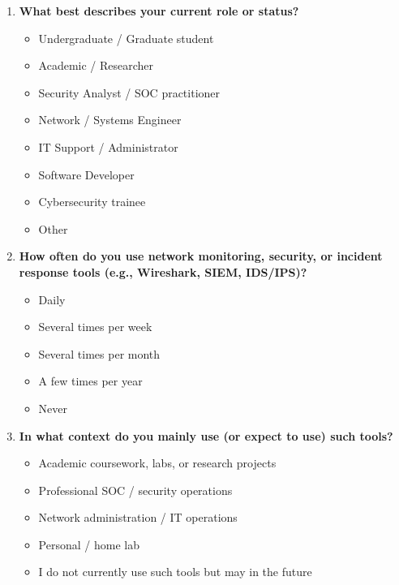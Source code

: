 \documentclass[
    11pt, 
    a4paper, 
    parskip=half, 
    headsepline,       %
    DIV=12             %
]{scrartcl}
\begin{document}
\begin{enumerate}[label=\textbf{\arabic*.}]
    
    \item \textbf{What best describes your current role or status?}
    \begin{itemize}[label=$\circ$, nosep]
        \item Undergraduate / Graduate student
        \item Academic / Researcher
        \item Security Analyst / SOC practitioner
        \item Network / Systems Engineer
        \item IT Support / Administrator
        \item Software Developer
        \item Cybersecurity trainee
        \item Other
    \end{itemize}

    \item \textbf{How often do you use network monitoring, security, or incident response tools (e.g., Wireshark, SIEM, IDS/IPS)?}
    \begin{itemize}[label=$\circ$, nosep]
        \item Daily
        \item Several times per week
        \item Several times per month
        \item A few times per year
        \item Never
    \end{itemize}

    \item \textbf{In what context do you mainly use (or expect to use) such tools?}
    \begin{itemize}[label=$\circ$, nosep]
        \item Academic coursework, labs, or research projects
        \item Professional SOC / security operations
        \item Network administration / IT operations
        \item Personal / home lab
        \item I do not currently use such tools but may in the future
    \end{itemize}


\end{enumerate}
\end{document}
